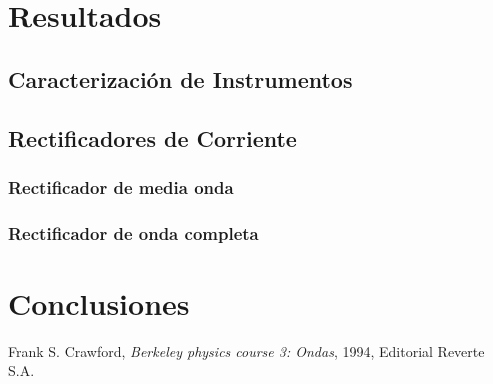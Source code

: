 \documentclass[11pt,a4paper]{article}
\begin{document}
\section{Resultados}
\label{sec:discusion}

\subsection{Caracterización de Instrumentos}




\subsection{Rectificadores de Corriente}




\subsubsection{Rectificador de media onda}


\subsubsection{Rectificador de onda completa}





\section{Conclusiones}
\label{sec:conclusiones}








\begin{thebibliography}{1}
  Frank S. Crawford, \textit{Berkeley physics course 3: Ondas}, 1994, Editorial Reverte S.A.
\end{thebibliography}
 
\end{document}
